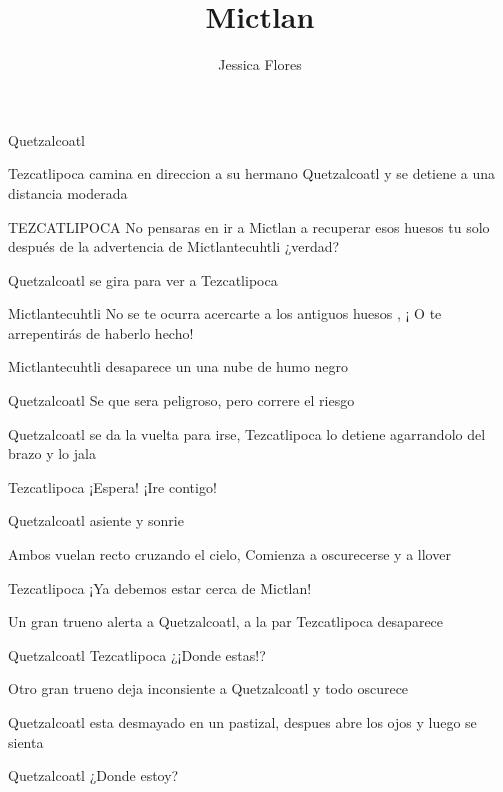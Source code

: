 \documentclass{screenplay}[2012/06/30]
\title{Mictlan}
\author{Jessica Flores}
\begin{document}
\coverpage
\fadein


\begin{dialogue}{Quetzalcoatl}

\end{dialogue}

Tezcatlipoca camina en direccion a su hermano Quetzalcoatl y se detiene a una distancia moderada
\begin{dialogue}{TEZCATLIPOCA}
No pensaras en ir a Mictlan a recuperar esos huesos tu solo después de la advertencia de Mictlantecuhtli ¿verdad?
\end{dialogue}

Quetzalcoatl se gira para ver a Tezcatlipoca

\fadein
{}

\begin{dialogue}[enojado]{Mictlantecuhtli}
No se te ocurra acercarte a los antiguos huesos ,  ¡ O te arrepentirás de haberlo hecho!
\end{dialogue}
Mictlantecuhtli desaparece un una nube de humo negro

\fadein
{}

\begin{dialogue}[obstinado]{Quetzalcoatl}
Se que sera peligroso, pero correre el riesgo
\end{dialogue}

Quetzalcoatl se da la vuelta para irse,
Tezcatlipoca lo detiene agarrandolo del brazo y lo jala

\begin{dialogue}[protector]{Tezcatlipoca}
¡Espera! ¡Ire contigo!
\end{dialogue}

Quetzalcoatl asiente y sonrie


\fadein
{}
Ambos vuelan recto cruzando el cielo,
Comienza a oscurecerse y a llover

\begin{dialogue}{Tezcatlipoca}
¡Ya debemos estar cerca de Mictlan!
\end{dialogue}

Un gran trueno alerta a Quetzalcoatl, a la par
Tezcatlipoca desaparece

\begin{dialogue}{Quetzalcoatl}
Tezcatlipoca ¿¡Donde estas!?
\end{dialogue}

Otro gran trueno deja inconsiente a Quetzalcoatl y todo oscurece

\fadein
{}

Quetzalcoatl esta desmayado en un pastizal, despues abre los ojos y luego se sienta
\begin{dialogue}[confundido]{Quetzalcoatl}
¿Donde estoy?
\end{dialogue}
\end{document}
